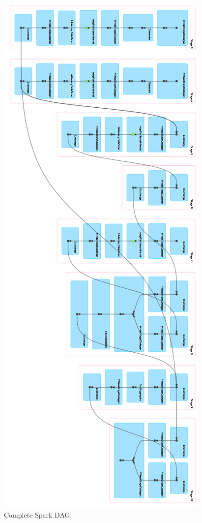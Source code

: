 \begin{figure}[H]
	\centering
	\includegraphics[scale=0.8]{images/3-spark/spark-DAG.png}
	\caption{Complete Spark DAG.}
	\label{fig:spark-DAG}
\end{figure}

